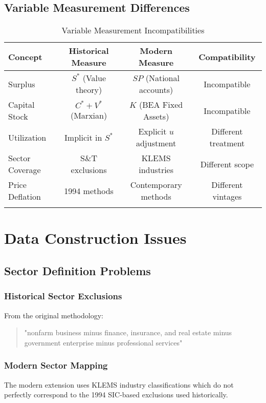 \documentclass[12pt]{article}
\begin{document}
\subsection{Variable Measurement Differences}

\begin{longtable}{lccc}
\toprule
\textbf{Concept} & \textbf{Historical Measure} & \textbf{Modern Measure} & \textbf{Compatibility} \\
\midrule
\endhead
Surplus & $S^*$ (Value theory) & $SP$ (National accounts) & Incompatible \\
Capital Stock & $C^* + V^*$ (Marxian) & $K$ (BEA Fixed Assets) & Incompatible \\
Utilization & Implicit in $S^*$ & Explicit $u$ adjustment & Different treatment \\
Sector Coverage & S\&T exclusions & KLEMS industries & Different scope \\
Price Deflation & 1994 methods & Contemporary methods & Different vintages \\
\bottomrule
\caption{Variable Measurement Incompatibilities}
\label{tab:variable_differences}
\end{longtable}

\section{Data Construction Issues}

\subsection{Sector Definition Problems}

\subsubsection{Historical Sector Exclusions}
From the original methodology:
\begin{quote}
"nonfarm business minus finance, insurance, and real estate minus government enterprise minus professional services"
\end{quote}

\subsubsection{Modern Sector Mapping}
The modern extension uses KLEMS industry classifications which do not perfectly correspond to the 1994 SIC-based exclusions used historically.
\end{document}
